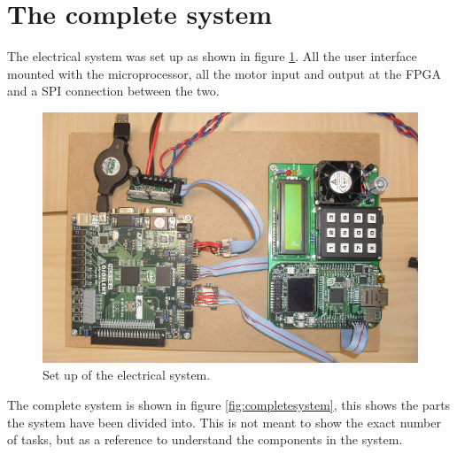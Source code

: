 \section{The complete system}

The electrical system was set up as shown in figure \ref{fig:digitalsystem}. All the user interface mounted with the microprocessor, all the motor input and output at the FPGA and a SPI connection between the two.

\begin{figure}[htb]
	\centering
	\includegraphics[width=\textwidth]{graphics/digitalsystem.png} %
	\caption{Set up of the electrical system.}
	\label{fig:digitalsystem}			%
\end{figure}


The complete system is shown in figure \ref{fig:completesystem}, this shows the parts the system have been divided into. This is not meant to show the exact number of tasks, but as a reference to understand the components in the system.



